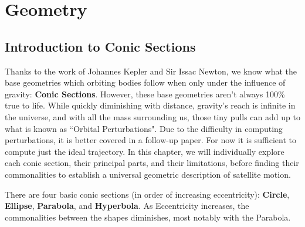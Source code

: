 \chapter{Geometry}
\usetikzlibrary{calc,patterns,angles,quotes}
\section{Introduction to Conic Sections}
Thanks to the work of Johannes Kepler and Sir Issac Newton, we know what the base geometries which orbiting bodies follow when only under the influence of gravity: \textbf{Conic Sections}. However, these base geometries aren't always 100\% true to life. While quickly diminishing with distance, gravity's reach is infinite in the universe, and with all the mass surrounding us, those tiny pulls can add up to what is known as ``Orbital Perturbations". Due to the difficulty in computing perturbations, it is better covered in a follow-up paper. For now it is sufficient to compute just the ideal trajectory. In this chapter, we will individually explore each conic section, their principal parts, and their limitations, before finding their commonalities to establish a universal geometric description of satellite motion.

There are four basic conic sections (in order of increasing eccentricity): \textbf{Circle}, \textbf{Ellipse}, \textbf{Parabola}, and \textbf{Hyperbola}. As Eccentricity increases, the commonalities between the shapes diminishes, most notably with the Parabola.
\\
\newcommand{\aster}{\textcolor{red}{*}}

